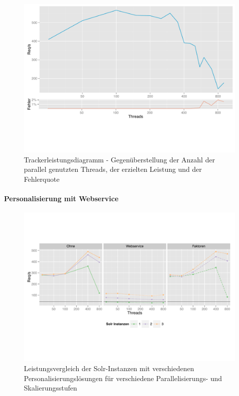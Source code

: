 \begin{figure}[H]
  \centering
    \includegraphics[width=\textwidth]{Abbildungen/tracker.pdf}
    \caption[Leistung Tracker]{Trackerleistungsdiagramm - Gegenüberstellung der Anzahl der parallel genutzten Threads, der erzielten Leistung und der Fehlerquote}
    \label{fig:chart_tracker}
\end{figure}

\paragraph{Personalisierung mit Webservice}

\begin{figure}[H]
  \centering
    \includegraphics[width=\textwidth]{Abbildungen/personalisierung.pdf}
    \caption[Leistung d. personalisierten Suche]{Leistungsvergleich der Solr-Instanzen mit verschiedenen Personalisierungslösungen für verschiedene Parallelisierungs- und Skalierungsstufen}
    \label{fig:chart_solr}
\end{figure}

